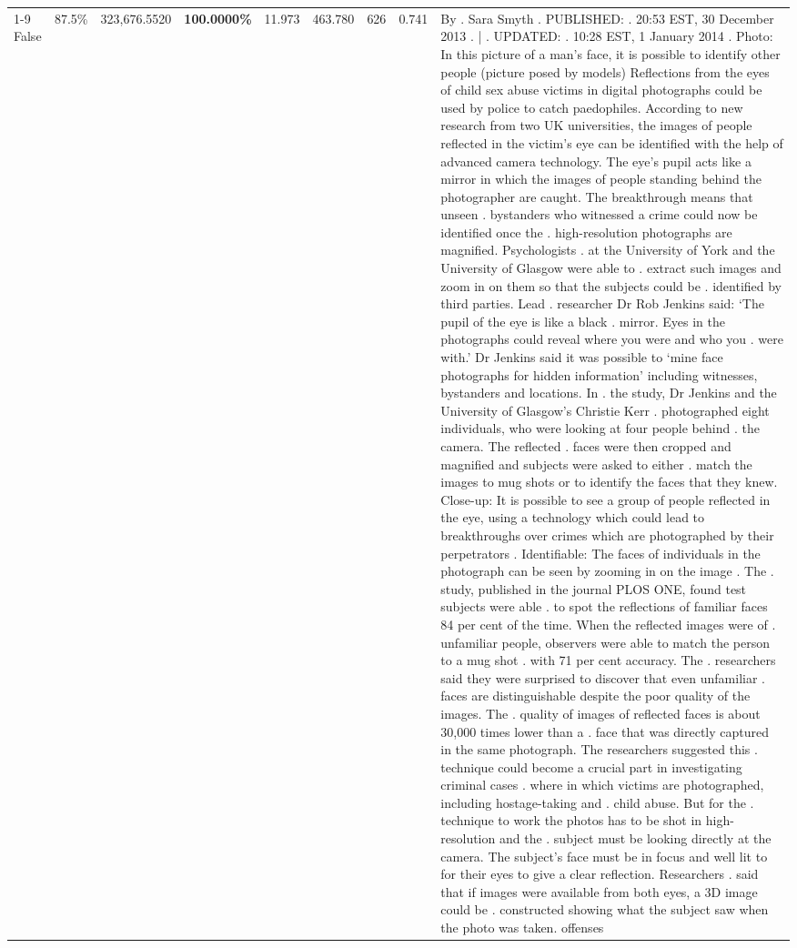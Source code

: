 \begin{table}[H]
\begin{tabular}{lllrlllll}
\cline{1-9}
False & 87.5\% & 323,676.5520 & \bfseries \color{red} 100.0000\% & 11.973 & 463.780 & 626 & 0.741 & By . Sara Smyth . PUBLISHED: . 20:53 EST, 30 December 2013 . | . UPDATED: . 10:28 EST, 1 January 2014 . Photo: In this picture of a man's face, it is possible to identify other people (picture posed by models) Reflections from the eyes of child sex abuse victims in digital photographs could be used by police to catch paedophiles. According to new research from two UK universities, the images of people reflected in the victim's eye can be identified with the help of advanced camera technology. The eye's pupil acts like a mirror in which the images of people standing behind the photographer are caught. The breakthrough means that unseen . bystanders who witnessed a crime could now be identified once the . high-resolution photographs are magnified. Psychologists . at the University of York and the University of Glasgow were able to . extract such images and zoom in on them so that the subjects could be . identified by third parties. Lead . researcher Dr Rob Jenkins said: ‘The pupil of the eye is like a black . mirror. Eyes in the photographs could reveal where you were and who you . were with.' Dr Jenkins said it was possible to ‘mine face photographs for hidden information' including witnesses, bystanders and locations. In . the study, Dr Jenkins and the University of Glasgow's Christie Kerr . photographed eight individuals, who were looking at four people behind . the camera. The reflected . faces were then cropped and magnified and subjects were asked to either . match the images to mug shots or to identify the faces that they knew. Close-up: It is possible to see a group of people reflected in the eye, using a technology which could lead to breakthroughs over crimes which are photographed by their perpetrators . Identifiable: The faces of individuals in the photograph can be seen by zooming in on the image . The . study, published in the journal PLOS ONE, found test subjects were able . to spot the reflections of familiar faces 84 per cent of the time. When the reflected images were of . unfamiliar people, observers were able to match the person to a mug shot . with 71 per cent accuracy. The . researchers said they were surprised to discover that even unfamiliar . faces are distinguishable despite the poor quality of the images. The . quality of images of reflected faces is about 30,000 times lower than a . face that was directly captured in the same photograph. The researchers suggested this . technique could become a crucial part in investigating criminal cases . where in which victims are photographed, including hostage-taking and . child abuse. But for the . technique to work the photos has to be shot in high-resolution and the . subject must be looking directly at the camera. The subject's face must be in focus and well lit to for their eyes to give a clear reflection. Researchers . said that if images were available from both eyes, a 3D image could be . constructed showing what the subject saw when the photo was taken. offenses \\

\end{tabular}
\end{table}
